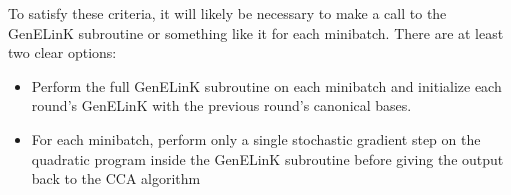 \documentclass{article}
\begin{document}
	\noindent To satisfy these criteria, it will likely be necessary to make a call to the GenELinK subroutine or something like it for each minibatch. There are at least two clear options:
	
	\begin{itemize}
		\item Perform the full GenELinK subroutine on each minibatch and initialize each round's GenELinK with the previous round's canonical bases.
		\item For each minibatch, perform only a single stochastic gradient step on the quadratic program inside the GenELinK subroutine before giving the output back to the CCA algorithm
	\end{itemize}
	
	
	
\end{document}
